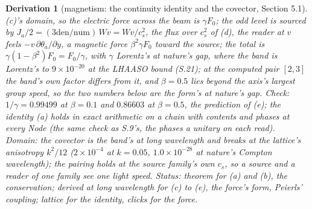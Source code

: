 \documentclass[pdflatex,sn-mathphys-num]{sn-jnl}
\newcommand{\num}{\mathrm{num}}
\newcommand{\den}{\mathrm{den}}
\theoremstyle{thmstyleone}
\newtheorem{derivation}{Derivation}
\begin{document}
\begin{derivation}[magnetism: the continuity identity and the covector, Section 5.1]
(c)'s domain, so the electric force across the beam is $\gamma F_0$; the odd level is sourced by $J_a / 2 = (3\den / \num)\,Wv = Wv / c_s^2$, the flux over $c_s^2$ of (d), the reader at $v$ feels $-v\,\partial\theta_a / \partial y$, a magnetic force $\beta^2\gamma F_0$ toward the source; the total is $\gamma(1 - \beta^2) F_0 = F_0 / \gamma$, with $\gamma$ Lorentz's at nature's gap, where the band is Lorentz's to $9 \times 10^{-20}$ at the LHAASO bound (S.21); at the computed pair $[2, 3]$ the band's own factor differs from it, and $\beta = 0.5$ lies beyond the axis's largest group speed, so the two numbers below are the form's at nature's gap. \emph{Check:} $1 / \gamma = 0.99499$ at $\beta = 0.1$ and $0.86603$ at $\beta = 0.5$, the prediction of (e); the identity (a) holds in exact arithmetic on a chain with contents and phases at every Node (the same check as S.9's, the phases a unitary on each read). \emph{Domain:} the covector is the band's at long wavelength and breaks at the lattice's anisotropy $k^2 / 12$ ($2 \times 10^{-4}$ at $k = 0.05$, $1.0 \times 10^{-28}$ at nature's Compton wavelength); the pairing holds at the source family's own $c_s$, so a source and a reader of one family see one light speed.
 \emph{Status:} theorem for (a) and (b), the conservation; derived at long wavelength for (c) to (e), the force's form, Peierls' coupling; lattice for the identity, clicks for the force.
\end{derivation}
\end{document}

